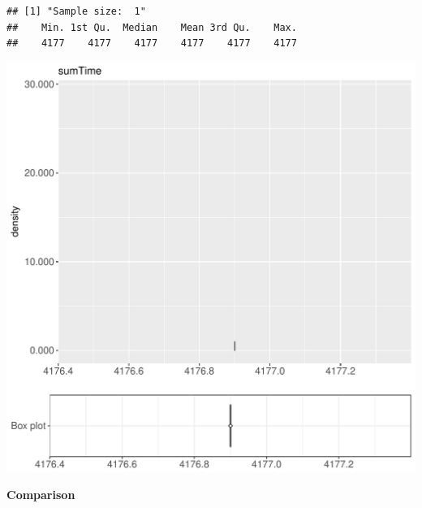 \documentclass{article}\usepackage[]{graphicx}\usepackage[]{color}
\makeatletter
\def\maxwidth{ %
  \ifdim\Gin@nat@width>\linewidth
    \linewidth
  \else
    \Gin@nat@width
  \fi
}
\newenvironment{kframe}{%
 \def\at@end@of@kframe{}%
 \ifinner\ifhmode%
  \def\at@end@of@kframe{\end{minipage}}%
  \begin{minipage}{\columnwidth}%
 \fi\fi%
 \def\FrameCommand##1{\hskip\@totalleftmargin \hskip-\fboxsep
 \colorbox{shadecolor}{##1}\hskip-\fboxsep
     \hskip-\linewidth \hskip-\@totalleftmargin \hskip\columnwidth}%
 \MakeFramed {\advance\hsize-\width
   \@totalleftmargin\z@ \linewidth\hsize
   \@setminipage}}%
 {\par\unskip\endMakeFramed%
 \at@end@of@kframe}
\newenvironment{knitrout}{}{} %
\makeatother
\begin{document}
\begin{knitrout}
\color{fgcolor}\begin{kframe}
\begin{verbatim}
## [1] "Sample size:  1"
##    Min. 1st Qu.  Median    Mean 3rd Qu.    Max. 
##    4177    4177    4177    4177    4177    4177
\end{verbatim}


{\ttfamily\noindent\bfseries{}}\end{kframe}
\includegraphics[width=\maxwidth]{figure/RH2_trivialcaching_crime-1} 

\end{knitrout}
  
 \textbf{Comparison}
  
\end{document}
